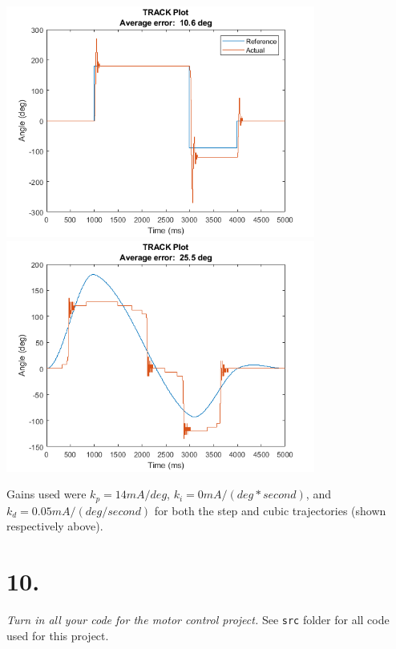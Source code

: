 \documentclass[12pt]{article}
\begin{document}
\begin{center}
    \includegraphics[width=4in]{step_kp14_ki0_kd0.05.png}
    \includegraphics[width=4in]{cubic_kp14_ki0_kd0.05.png}
\end{center}

Gains used were $k_p = 14 mA/deg$, $k_i = 0 mA/(deg*second)$, and $k_d = 0.05 mA/(deg/second)$ for both the step and cubic trajectories (shown respectively above).

\section*{10.}
\textit{Turn in all your code for the motor control project.}
See \verb|src| folder for all code used for this project.
\end{document}
